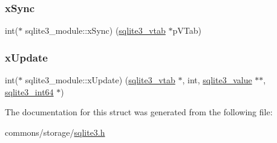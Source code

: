 \mbox{\label{structsqlite3__module_a3a2dda4b384eef16bf939e3c25df7282}} 
\subsubsection{\texorpdfstring{xSync}{xSync}}
{\footnotesize\ttfamily int($\ast$ sqlite3\+\_\+module\+::x\+Sync) (\mbox{\hyperlink{structsqlite3__vtab}{sqlite3\+\_\+vtab}} $\ast$p\+V\+Tab)}

\mbox{\label{structsqlite3__module_aa6c44549a07cc5bf36fae44930069ade}} 
\subsubsection{\texorpdfstring{xUpdate}{xUpdate}}
{\footnotesize\ttfamily int($\ast$ sqlite3\+\_\+module\+::x\+Update) (\mbox{\hyperlink{structsqlite3__vtab}{sqlite3\+\_\+vtab}} $\ast$, int, \mbox{\hyperlink{sqlite3_8h_ac2fa1ecdb2290d9af6010edbd1cbc83c}{sqlite3\+\_\+value}} $\ast$$\ast$, \mbox{\hyperlink{sqlite3_8h_a0a4d3e6c1ad46f90e746b920ab6ca0d2}{sqlite3\+\_\+int64}} $\ast$)}



The documentation for this struct was generated from the following file\+:\begin{DoxyCompactItemize}
\item 
commons/storage/\mbox{\hyperlink{sqlite3_8h}{sqlite3.\+h}}\end{DoxyCompactItemize}
